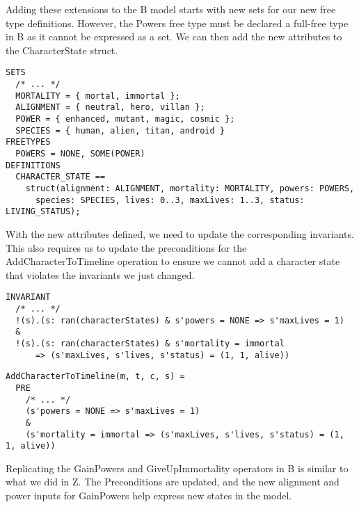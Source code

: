 \documentclass{article}
\begin{document}
\hspace{-0.68cm} Adding these extensions to the B model starts with new sets for our new free type definitions. However, the Powers free type must be declared a full-free type in B as it cannot be expressed as a set. We can then add the new attributes to the CharacterState struct.

\begin{verbatim}
SETS 
  /* ... */
  MORTALITY = { mortal, immortal };
  ALIGNMENT = { neutral, hero, villan };
  POWER = { enhanced, mutant, magic, cosmic };
  SPECIES = { human, alien, titan, android }
FREETYPES
  POWERS = NONE, SOME(POWER)
DEFINITIONS
  CHARACTER_STATE == 
    struct(alignment: ALIGNMENT, mortality: MORTALITY, powers: POWERS, 
      species: SPECIES, lives: 0..3, maxLives: 1..3, status: LIVING_STATUS);
\end{verbatim}

\hspace{-0.64cm} With the new attributes defined, we need to update the corresponding invariants. This also requires us to update the preconditions for the AddCharacterToTimeline operation to ensure we cannot add a character state that violates the invariants we just changed.

\begin{verbatim}
INVARIANT
  /* ... */
  !(s).(s: ran(characterStates) & s'powers = NONE => s'maxLives = 1)
  &
  !(s).(s: ran(characterStates) & s'mortality = immortal 
      => (s'maxLives, s'lives, s'status) = (1, 1, alive))
\end{verbatim}

\begin{verbatim}
AddCharacterToTimeline(m, t, c, s) =
  PRE
    /* ... */
    (s'powers = NONE => s'maxLives = 1)
    &
    (s'mortality = immortal => (s'maxLives, s'lives, s'status) = (1, 1, alive))
\end{verbatim}

\hspace{-0.64cm} Replicating the GainPowers and GiveUpImmortality operators in B is similar to what we did in Z. The Preconditions are updated, and the new alignment and power inputs for GainPowers help express new states in the model.
\end{document}
